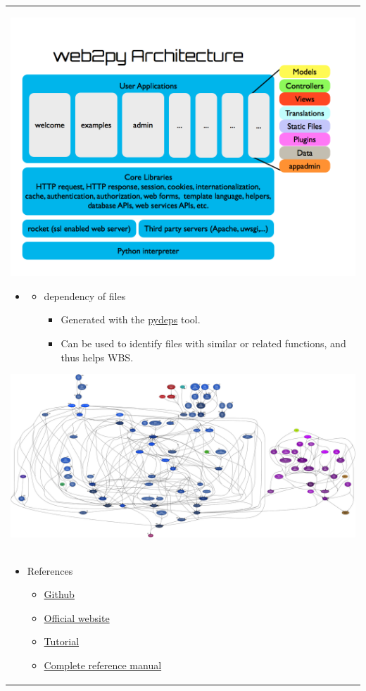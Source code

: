 \documentclass{article}
\begin{document}
\begin{longtable}{|p{\textwidth}|}
\hline

\begin{center}
	\includegraphics[width=.6\textwidth]{structure1}
\end{center}

\begin{itemize}
	\item[]
	\begin{itemize}
		\item dependency of files
		\begin{itemize}
			\item Generated with the \href{https://github.com/thebjorn/pydeps}{pydeps} tool.
			\item Can be used to identify files with similar or related functions, and thus helps WBS.
		\end{itemize}
	\end{itemize}
\end{itemize}

\begin{center}
\includegraphics[width=.6\textwidth]{web2py_5}
\end{center} \\

\begin{itemize}
	\item References
	\begin{itemize}
		\item \href{https://github.com/web2py/web2py/}{Github}
		\item \href{http://www.web2py.com/}{Official website}
		\item \href{http://www.web2py.com/books/default/chapter/29/00/preface}{Tutorial}
		\item \href{https://mdipierro.github.io/web2py/web2py_manual_5th.pdf}{Complete reference manual}
	\end{itemize}			
\end{itemize} \\
\hline
\end{longtable}
\end{document}
